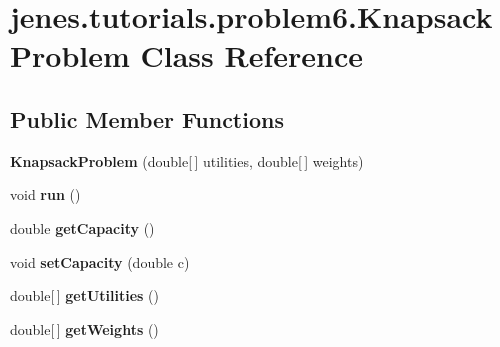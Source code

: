 \hypertarget{classjenes_1_1tutorials_1_1problem6_1_1_knapsack_problem}{\section{jenes.\-tutorials.\-problem6.\-Knapsack\-Problem Class Reference}
\label{classjenes_1_1tutorials_1_1problem6_1_1_knapsack_problem}
}
\subsection*{Public Member Functions}
\begin{DoxyCompactItemize}
\item 
\hypertarget{classjenes_1_1tutorials_1_1problem6_1_1_knapsack_problem_a5c921b1c3d9dbbe35decc777cf59169d}{{\bfseries Knapsack\-Problem} (double\mbox{[}$\,$\mbox{]} utilities, double\mbox{[}$\,$\mbox{]} weights)}\label{classjenes_1_1tutorials_1_1problem6_1_1_knapsack_problem_a5c921b1c3d9dbbe35decc777cf59169d}

\item 
\hypertarget{classjenes_1_1tutorials_1_1problem6_1_1_knapsack_problem_a174433680cf824c4238f690d84a43e38}{void {\bfseries run} ()}\label{classjenes_1_1tutorials_1_1problem6_1_1_knapsack_problem_a174433680cf824c4238f690d84a43e38}

\item 
\hypertarget{classjenes_1_1tutorials_1_1problem6_1_1_knapsack_problem_af5b99c0408de24f2d7598f14dc597ef7}{double {\bfseries get\-Capacity} ()}\label{classjenes_1_1tutorials_1_1problem6_1_1_knapsack_problem_af5b99c0408de24f2d7598f14dc597ef7}

\item 
\hypertarget{classjenes_1_1tutorials_1_1problem6_1_1_knapsack_problem_a9caf9c53d4ce0e4b17ceb163ee8ab837}{void {\bfseries set\-Capacity} (double c)}\label{classjenes_1_1tutorials_1_1problem6_1_1_knapsack_problem_a9caf9c53d4ce0e4b17ceb163ee8ab837}

\item 
\hypertarget{classjenes_1_1tutorials_1_1problem6_1_1_knapsack_problem_a1eddd1274f86fe1b3e61668f072dc364}{double\mbox{[}$\,$\mbox{]} {\bfseries get\-Utilities} ()}\label{classjenes_1_1tutorials_1_1problem6_1_1_knapsack_problem_a1eddd1274f86fe1b3e61668f072dc364}

\item 
\hypertarget{classjenes_1_1tutorials_1_1problem6_1_1_knapsack_problem_a3f94e77e8f2ea920b9ec1dede3ed53f8}{double\mbox{[}$\,$\mbox{]} {\bfseries get\-Weights} ()}\label{classjenes_1_1tutorials_1_1problem6_1_1_knapsack_problem_a3f94e77e8f2ea920b9ec1dede3ed53f8}

\end{DoxyCompactItemize}
